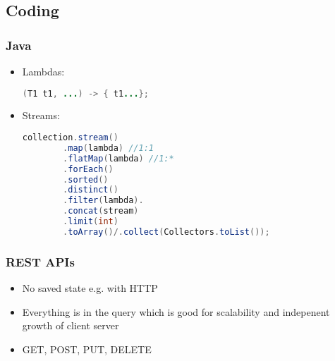 \documentclass[10pt]{article}
\begin{document}
\begin{comment}
\subsubsection{Static}
If you know the keys ahead of time, use primary hash function to find out where they go to, then build secondary perfect hash functions. This will be $O(1)$ worst case and $O(n)$ space, since you know ahead of time how large to make your secondary arrays.
\end{comment}

\subsection{Coding}
\subsubsection{Java}
\begin{itemize}
    \itemsep0em
    \item Lambdas:
    \begin{lstlisting}[language=java]
    (T1 t1, ...) -> { t1...};
    \end{lstlisting}
    \item Streams:
    \begin{lstlisting}[language=java]
    collection.stream()
        .map(lambda) //1:1
        .flatMap(lambda) //1:*
        .forEach()
        .sorted()
        .distinct()
        .filter(lambda).
        .concat(stream)
        .limit(int)
        .toArray()/.collect(Collectors.toList());
    \end{lstlisting}
\end{itemize}

\subsubsection{REST APIs}
\begin{itemize}
    \itemsep0em
    \item No saved state e.g. with HTTP
    \item Everything is in the query which is good for scalability and indepenent growth of client server
    \item GET, POST, PUT, DELETE
\end{itemize}
\end{document}
